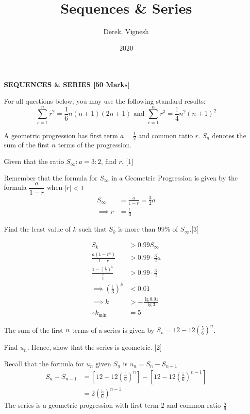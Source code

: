 \documentclass[12pt, a4 paper]{article}
\title{Sequences \& Series}
\author{Derek, Vignesh}
\date{2020}
\begin{document}
\maketitle

\textbf{SEQUENCES \& SERIES [50 Marks]}

For all questions below, you may use the following standard results:
\[
\sum_{r=1}^{n}r^2=\frac{1}{6}n(n+1)(2n+1) \textrm{ and }\sum_{r=1}^{n}r^3=\frac{1}{4}n^2{(n+1)}^2
\]
\begin{outline}[enumerate]
 \1 A geometric progression has first term \(a=\frac{1}{2}\) and common ratio \(r\). \(S_{n}\) denotes the sum of the first \(n\) terms of the progression. %

 \2 Given that the ratio \(S_{\infty}:a=3:2\), find \(r\). \hfill[1]
 \begin{answer}
  Remember that the formula for \( S_\infty \) in a Geometric Progression is given by the formula \( \dfrac{a}{1-r} \) when \( |r|<1 \)
  \begin{align*}
   S_\infty   & = \frac{a}{1-r} = \frac{3}{2}a \\
   \implies r & = \frac{1}{3}
  \end{align*}
 \end{answer}

 \2 Find the least value of \(k\) such that \(S_{k}\) is more than 99\% of \(S_{\infty}\).\hfill[3]
 \begin{answer}
  \begin{align*}
   S_k                                                & > 0.99S_\infty              \\
   \frac{a(1-r^k)}{1-r}                               & > 0.99 \cdot \frac{3}{2}a   \\
   \frac{1-{\left(\frac{1}{3}\right)}^k}{\frac{2}{3}} & > 0.99 \cdot \frac{3}{2}    \\
   \implies {\left(\frac{1}{3}\right)}^k              & < 0.01                      \\
   \implies k                                         & > -\frac{\lg{0.01}}{\lg{3}} \\
   \therefore k_{\min}                                & = 5
  \end{align*}
 \end{answer}

 \1 The sum of the first \(n\) terms of a series is given by \(S_{n}=12-12{\left(\frac{5}{6}\right)}^{n}\). %

 \2 Find \(u_{n}\). Hence, show that the series is geometric. \hfill[2]
 \begin{answer}
  Recall that the formula for \(u_n\) given \(S_n\) is \(u_n = S_n - S_{n-1} \)
  \begin{align*}
   S_n - S_{n-1} & = \left[12-12{\left(\frac{5}{6}\right)}^{n}\right] - \left[12-12{\left(\frac{5}{6}\right)}^{n-1}\right] \\
                 & = 2{\left(\frac{5}{6}\right)}^{n-1}
  \end{align*}
  The series is a geometric progression with first term 2 and common ratio \(\frac{5}{6}\)
 \end{answer}


\end{outline}
\end{document}
